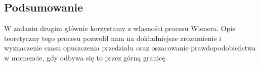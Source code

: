 \documentclass[12pt]{mwart}
\begin{document}
 \subsection{Podsumowanie}
	\noindent W zadaniu drugim głównie korzystamy z własności procesu Wienera. Opis teoretyczny tego procesu pozwolił nam na dokładniejsze zrozumienie i wyznaczenie czasu opuszczenia przedziału oraz oszacowanie prawdopodobieństwa w momencie, gdy odbywa się to przez górną granicę.
	
	
\end{document}
